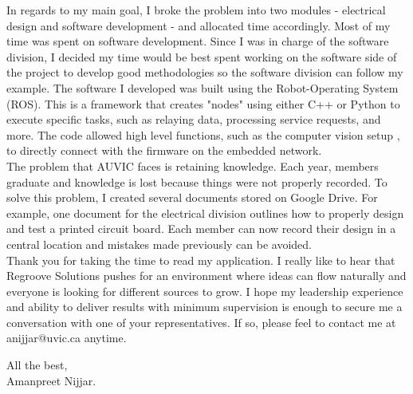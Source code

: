 \documentclass[10pt,a4paper,ragged2e,withhyper]{altacv}
\newcommand{\company}{Regroove Solutions}
\begin{document}
In regards to my main goal, I broke the problem into two modules - electrical design and software development - and allocated time accordingly. Most of my time was spent on software development. Since I was in charge of the software division, I decided my time would be best spent working on the software side of the project to develop good methodologies so the software division can follow my example. The software I developed was built using the Robot-Operating System (ROS). This is a framework that creates "nodes" using either C++ or Python to execute specific tasks, such as relaying data, processing service requests, and more. The code allowed high level functions, such as the computer vision setup , to directly connect with the firmware on the embedded network.
 \linebreak \\
 
The problem that AUVIC faces is retaining knowledge. Each year, members graduate and knowledge is lost because things were not properly recorded. To solve this problem, I created several documents stored on Google Drive. For example, one document for the electrical division outlines how to properly design and test a printed circuit board. Each member can now record their design in a central location and mistakes made previously can be avoided.\linebreak \\

Thank you for taking the time to read my application. I really like to hear that {\company} pushes for an environment where ideas can flow naturally and everyone is looking for different sources to grow. I hope my leadership experience and ability to deliver results with minimum supervision is enough to secure me a conversation with one of your representatives. If so, please feel to contact me at anijjar@uvic.ca anytime. \linebreak \linebreak 

All the best, \linebreak \linebreak \\

Amanpreet Nijjar.
\end{document}
